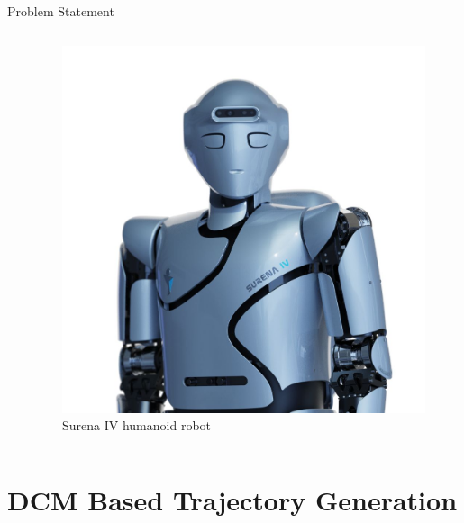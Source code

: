 \documentclass[aspectratio=169,t,xcolor=table]{beamer}
\begin{document}
\begin{frame}{Problem Statement}
\begin{columns}
\begin{column}{0.5\textwidth}
        \end{column}
        \begin{column}{0.6\textwidth}
            \begin{figure}
                \centering
                \includegraphics[height = 0.5\textheight]{lib/logos/SurenaIV.jpeg}
                \caption{Surena IV humanoid robot}
            \end{figure}
        \end{column}
    \end{columns}
\end{frame}

\section{DCM Based Trajectory Generation}

\end{document}
